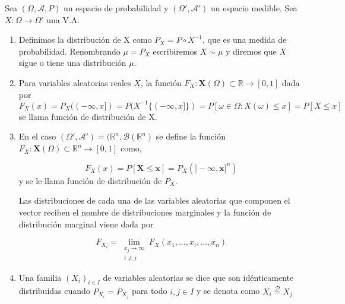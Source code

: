    
    
    \begin{definicion}
            Sea $(\Omega, \mathcal{A}, P)$ un espacio de probabilidad y $(\Omega',\mathcal{A}')$ un espacio medible. Sea $X:\Omega \to \Omega'$ una V.A.
        \begin{enumerate}
        
            \item Definimos la distribución de X como $P_X = P \circ X^{-1}$, que es una medida de probabilidad. Renombrando $\mu = P_X$ escribiremos $X \sim \mu$ y diremos que $X$ sigue o tiene una distribución $\mu$.
                
            \item Para variables aleatorias reales $X$, la función $F_X: \mathbf{X}(\Omega) \subset \mathbb{R} \to [0,1]$ dada por ${ F_X(x) = P_X((-\infty,x]) = P(X^{-1}\{(-\infty,x]\}) = P[\omega \in \Omega: X(\omega) \leq x] = P[X \leq x]}$ se llama función de distribución de X.
                
            \item En el caso $(\Omega', \mathcal{A}')=(\mathbb{R}^n,\mathcal{B}(\mathbb{R}^n)$ se define la función $F_X: \mathbf{X}(\Omega) \subset \mathbb{R}^n \to [0,1]$ como, 
                
                $$F_X(x) = P[\mathbf{X} \leq \mathbf{x}] = P_X(]-\infty,\mathbf{x}]^n)$$ y se le llama función de distribución de $P_X$.
                
            Las distribuciones de cada una de las variables aleatorias que componen el vector reciben el nombre de distribuciones marginales y la función de distribución marginal viene dada por
            
            $$F_{X_i} = \lim_{\substack{x_j \to \infty \\ i \neq j }} F_X(x_1,...,x_i,...,x_n)$$
                
            \item Una familia $(X_i)_{i \in I}$ de variables aleatorias se dice que son idénticamente distribuidas cuando $P_{X_i} = P_{X_j}$ para todo $i,j \in I$ y se denota como $X_i \overset{\mathcal{D}}{=} X_j$
        \end{enumerate}
        
    \end{definicion}
    
